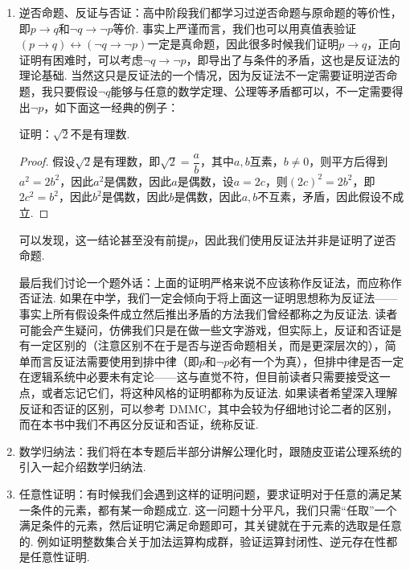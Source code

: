 \begin{enumerate}
    \item 逆否命题、反证与否证：高中阶段我们都学习过逆否命题与原命题的等价性，即$p\to q$和$\lnot q\to\lnot p$等价. 事实上严谨而言，我们也可以用真值表验证$(p\to q)\leftrightarrow(\lnot q\to\lnot p)$一定是真命题，因此很多时候我们证明$p\to q$，正向证明有困难时，可以考虑$\lnot q\to\lnot p$，即导出了与条件的矛盾，这也是反证法的理论基础. 当然这只是反证法的一个情况，因为反证法不一定需要证明逆否命题，我只要假设$\lnot q$能够与任意的数学定理、公理等矛盾都可以，不一定需要得出$\lnot p$，如下面这一经典的例子：

          \begin{example}{}{}
              证明：$\sqrt{2}$不是有理数.
          \end{example}
          \begin{proof}
              假设$\sqrt{2}$是有理数，即$\sqrt{2}=\dfrac{a}{b}$，其中$a,b$互素，$b\neq 0$，则平方后得到$a^2=2b^2$，因此$a^2$是偶数，因此$a$是偶数，设$a=2c$，则$(2c)^2=2b^2$，即$2c^2=b^2$，因此$b^2$是偶数，因此$b$是偶数，因此$a,b$不互素，矛盾，因此假设不成立.
          \end{proof}

          可以发现，这一结论甚至没有前提$p$，因此我们使用反证法并非是证明了逆否命题.

          最后我们讨论一个题外话：上面的证明严格来说不应该称作反证法，而应称作否证法. 如果在中学，我们一定会倾向于将上面这一证明思想称为反证法——事实上所有假设条件成立然后推出矛盾的方法我们曾经都称之为反证法. 读者可能会产生疑问，仿佛我们只是在做一些文字游戏，但实际上，反证和否证是有一定区别的（注意区别不在于是否与逆否命题相关，而是更深层次的），简单而言反证法需要使用到排中律（即$p$和$\lnot p$必有一个为真），但排中律是否一定在逻辑系统中必要未有定论——这与直觉不符，但目前读者只需要接受这一点，或者忘记它们，将这种风格的证明都称为反证法. 如果读者希望深入理解反证和否证的区别，可以参考 DMMC，其中会较为仔细地讨论二者的区别，而在本书中我们不再区分反证和否证，统称反证.

    \item 数学归纳法：我们将在本专题后半部分讲解公理化时，跟随皮亚诺公理系统的引入一起介绍数学归纳法.

    \item 任意性证明：有时候我们会遇到这样的证明问题，要求证明对于任意的满足某一条件的元素，都有某一命题成立. 这一问题十分平凡，我们只需``任取''一个满足条件的元素，然后证明它满足命题即可，其关键就在于元素的选取是任意的. 例如证明整数集合关于加法运算构成群，验证运算封闭性、逆元存在性都是任意性证明.


\end{enumerate}

